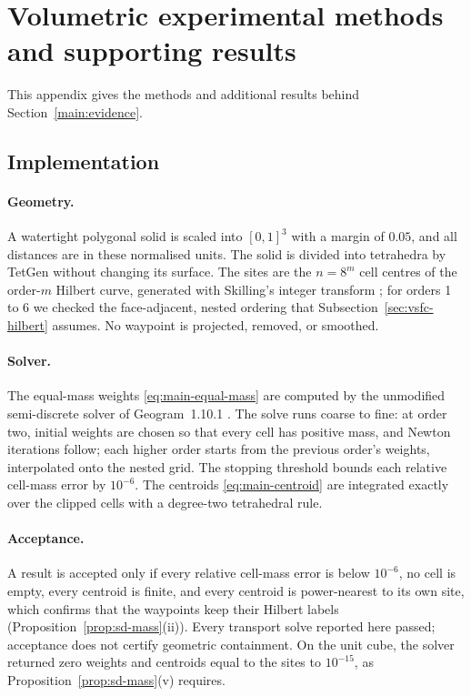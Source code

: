 \section{Volumetric experimental methods and supporting results}
\label{sec:experiments}

This appendix gives the methods and additional results behind Section~\ref{main:evidence}.

\subsection{Implementation}
\label{sec:implementation}

\paragraph{Geometry.}
A watertight polygonal solid is scaled into $[0,1]^3$ with a margin of $0.05$, and all distances are in these normalised units. The solid is divided into tetrahedra by TetGen \cite{si2015tetgen} without changing its surface. The sites are the $n=8^m$ cell centres of the order-$m$ Hilbert curve, generated with Skilling's integer transform \cite{skilling2004}; for orders 1 to 6 we checked the face-adjacent, nested ordering that Subsection~\ref{sec:vsfc-hilbert} assumes. No waypoint is projected, removed, or smoothed.

\paragraph{Solver.}
The equal-mass weights \eqref{eq:main-equal-mass} are computed by the unmodified semi-discrete solver of Geogram~1.10.1 \cite{levy2015numerical}. The solve runs coarse to fine: at order two, initial weights are chosen so that every cell has positive mass, and Newton iterations \cite{kitagawa2019convergence} follow; each higher order starts from the previous order's weights, interpolated onto the nested grid. The stopping threshold bounds each relative cell-mass error by $10^{-6}$. The centroids \eqref{eq:main-centroid} are integrated exactly over the clipped cells with a degree-two tetrahedral rule.

\paragraph{Acceptance.}
A result is accepted only if every relative cell-mass error is below $10^{-6}$, no cell is empty, every centroid is finite, and every centroid is power-nearest to its own site, which confirms that the waypoints keep their Hilbert labels (Proposition~\ref{prop:sd-mass}(ii)). Every transport solve reported here passed; acceptance does not certify geometric containment. On the unit cube, the solver returned zero weights and centroids equal to the sites to $10^{-15}$, as Proposition~\ref{prop:sd-mass}(v) requires.

